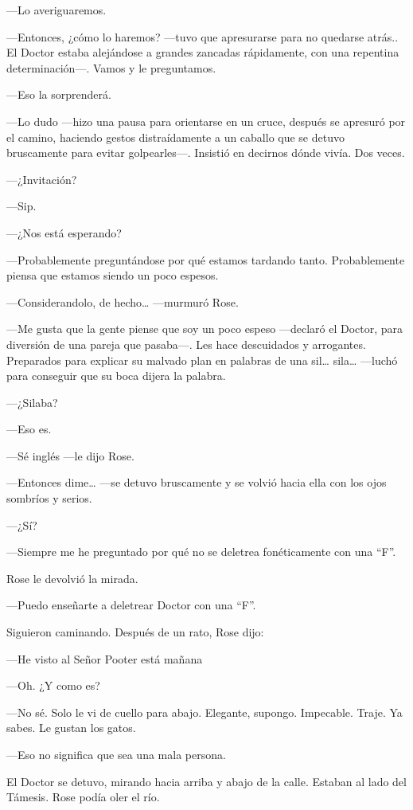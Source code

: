 {---Lo averiguaremos.}

{---Entonces, ¿cómo lo haremos? ---tuvo que apresurarse para no quedarse
	atrás.. El Doctor estaba alejándose a grandes zancadas rápidamente, con
una repentina determinación---. Vamos y le preguntamos.}

{---Eso la sorprenderá.}

{---Lo dudo ---hizo una pausa para orientarse en un cruce, después se
	apresuró por el camino, haciendo gestos distraídamente a un caballo que
	se detuvo bruscamente para evitar golpearles---. Insistió en decirnos
dónde vivía. Dos veces.}

{---¿Invitación?}

{---Sip.}

{---¿Nos está esperando?}

{---Probablemente preguntándose por qué estamos tardando tanto.
Probablemente piensa que estamos siendo un poco espesos.}

{---Considerandolo, de hecho\ldots{} ---murmuró Rose.}

{---Me gusta que la gente piense que soy un poco espeso ---declaró el
	Doctor, para diversión de una pareja que pasaba---. Les hace descuidados
	y arrogantes. Preparados para explicar su malvado plan en palabras de
	una sil\ldots{} sila\ldots{} ---luchó para conseguir que su boca dijera la
palabra.}

{---¿Silaba?}

{---Eso es.}

{---Sé inglés ---le dijo Rose.}

{---Entonces dime\ldots{} ---se detuvo bruscamente y se volvió hacia
ella con los ojos sombríos y serios.}

{---¿Sí?}

{---Siempre me he preguntado por qué no se deletrea fonéticamente con
una ``F''.}

{Rose le devolvió la mirada.}

{---Puedo enseñarte a deletrear Doctor con una ``F''.}

{Siguieron caminando. Después de un rato, Rose dijo:}

{---He visto al Señor Pooter está mañana}

{---Oh. ¿Y como es?}

{---No sé. Solo le vi de cuello para abajo. Elegante, supongo.
Impecable. Traje. Ya sabes. Le gustan los gatos.}

{---Eso no significa que sea una mala persona.}

{El Doctor se detuvo, mirando hacia arriba y abajo de la calle. Estaban
al lado del Támesis. Rose podía oler el río.}

